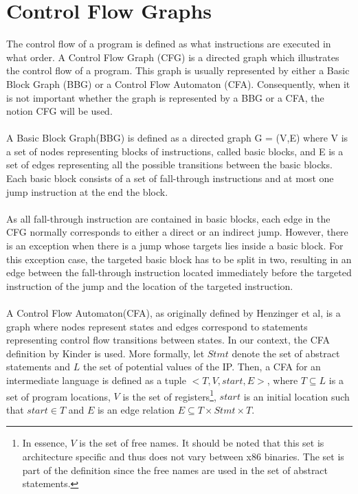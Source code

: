 \documentclass{kththesis}
\newcommand{\fbcomment}[1]{{#1}}
\renewcommand{\fbcomment}[1]{}
\begin{document}
\section{Control Flow Graphs}
\fbcomment{\color{red}Goal: Introduce the concept of CFG, BBG and CFA as well as describing the diference between them. Additionally, explain when a generalised CFA isn't equivalent to the common CFA.}
The control flow of a program is defined as what instructions are executed in what order. A Control Flow Graph (CFG) is a directed graph which illustrates the control flow of a program. This graph is usually represented by either a Basic Block Graph (BBG) or a Control Flow Automaton (CFA). Consequently, when it is not important whether the graph is represented by a BBG or a CFA, the notion CFG will be used. 
\\ \\
A Basic Block Graph(BBG) is defined as a directed graph G = (V,E) where V is a set of nodes representing blocks of instructions, called basic blocks, and E is a set of edges representing all the possible transitions between the basic blocks. Each basic block consists of a set of fall-through instructions and at most one jump instruction at the end the block. 
\\ \\
As all fall-through instruction are contained in basic blocks, each edge in the CFG normally corresponds to either a direct or an indirect jump. However, there is an exception when there is a jump whose targets lies inside a basic block. For this exception case, the targeted basic block has to be split in two, resulting in an edge between the fall-through instruction located immediately before the targeted instruction of the jump and the location of the targeted instruction. 
\\ \\ 
A Control Flow Automaton(CFA), as originally defined by Henzinger et al\cite{lazyAbstraction}, is a graph where nodes represent states and edges correspond to statements representing control flow transitions between states. In our context, the CFA definition by Kinder\cite{Jakstab} is used. More formally, let $Stmt$ denote the set of abstract statements and $L$ the set of potential values of the IP. Then, a CFA for an intermediate language is defined as a tuple $<T,V,start,E>$, where $T \subseteq L$ is a set of program locations, $V$ is the set of registers\footnote{In essence, $V$ is the set of free names. It should be noted that this set is architecture specific and thus does not vary between x86 binaries. The set is part of the definition since the free names are used in the set of abstract statements.}, $start$ is an initial location such that $start \in T$ and $E$ is an edge relation $E \subseteq T \times Stmt \times T$. 
\end{document}
